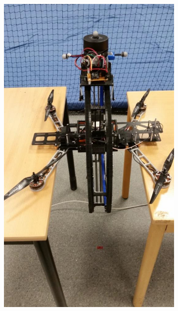 \begin{figure}[h]
\begin{subfigure}[t]{0.49\textwidth}
		\includegraphics[scale = 0.3]{images/prometheus4.jpg}
		\label{subfig:prometheus3}
	\end{subfigure} 
	\begin{subfigure}[t]{0.49\textwidth}
		\centering

\end{subfigure}
\end{figure}

